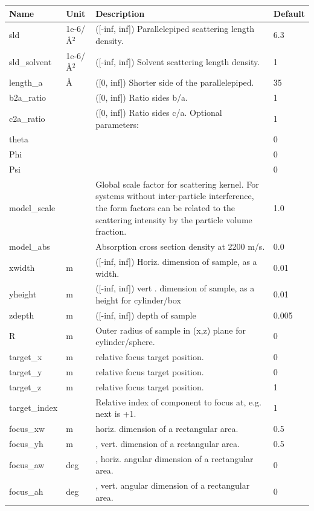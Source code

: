 \begin{longtable}{p{}p{}p{}p{}}
\toprule
\textbf{Name} & \textbf{Unit} & \textbf{Description} & \textbf{Default} \\
\midrule
\endhead
sld & 1e-6/\AA{}$^{2}$ & ([-inf, inf]) Parallelepiped scattering length density. & 6.3 \\
sld\_solvent & 1e-6/\AA{}$^{2}$ & ([-inf, inf]) Solvent scattering length density. & 1 \\
length\_a & \AA{} & ([0, inf]) Shorter side of the parallelepiped. & 35 \\
b2a\_ratio &  & ([0, inf]) Ratio sides b/a. & 1 \\
c2a\_ratio &  & ([0, inf]) Ratio sides c/a. Optional parameters: & 1 \\
theta &  &  & 0 \\
Phi &  &  & 0 \\
Psi &  &  & 0 \\
model\_scale &   & Global scale factor for scattering kernel. For systems without inter-particle interference, the form factors can be related to the scattering intensity by the particle volume fraction. & 1.0 \\
model\_abs &   & Absorption cross section density at 2200 m/s. & 0.0 \\
xwidth & m & ([-inf, inf]) Horiz. dimension of sample, as a width. & 0.01 \\
yheight & m & ([-inf, inf]) vert . dimension of sample, as a height for cylinder/box & 0.01 \\
zdepth & m & ([-inf, inf]) depth of sample & 0.005 \\
R & m & Outer radius of sample in (x,z) plane for cylinder/sphere. & 0 \\
target\_x & m & relative focus target position. & 0 \\
target\_y & m & relative focus target position. & 0 \\
target\_z & m & relative focus target position. & 1 \\
target\_index &   & Relative index of component to focus at, e.g. next is +1. & 1 \\
focus\_xw & m & horiz. dimension of a rectangular area. & 0.5 \\
focus\_yh & m & , vert. dimension of a rectangular area. & 0.5 \\
focus\_aw & deg & , horiz. angular dimension of a rectangular area. & 0 \\
focus\_ah & deg & , vert. angular dimension of a rectangular area. & 0 \\

\end{longtable}
